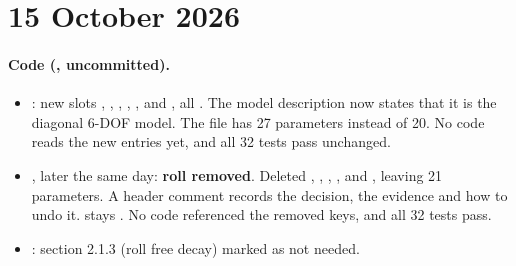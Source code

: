 \section*{15 October 2026}

\paragraph{Code (, uncommitted).}
\begin{itemize}
  \item {}: new slots , ,
        , , ,
         and , all . The model
        description now states that it is the diagonal 6-DOF model. The file has 27
        parameters instead of 20. No code reads the new entries yet, and all 32 tests pass
        unchanged.
  \item {}, later the same day: \textbf{roll removed}. Deleted
        , , ,
        ,  and , leaving
        21 parameters. A header comment records the decision, the evidence and how to undo it.
         stays . No code referenced the removed keys, and all 32
        tests pass.
  \item {}: section 2.1.3 (roll free decay) marked as not needed.
\end{itemize}

